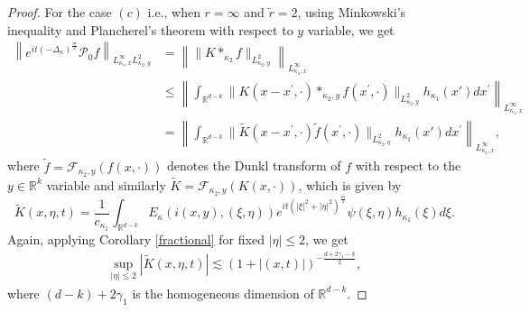 \documentclass[a4paper,11pt, reqno]{amsart}
\theoremstyle{definition}
\theoremstyle{remark}
\numberwithin{equation}{section}
\newcommand{\K}{\kappa }
\begin{document}
\begin{proof}
		For the case $(c)$ i.e., when $r=\infty$ and $\tilde{r}=2$,  using Minkowski's inequality and Plancherel's theorem with respect to $y$ variable, we get 
		\begin{align}\label{DKernel 2}\nonumber
			\left\|e^{i t(-\Delta_\kappa)^{\frac{m}{2}}}\mathcal{P}_0 f\right\|_{L_{\kappa_1, x}^{\infty} L_{\kappa_2, y}^2} 
			& =\left\|\| K*_{\kappa_2} f \|_{L_{\kappa_2, y}^2}\right\|_{L_{\kappa_1, x}^{\infty}} \\\nonumber
			& \leq\left\|\int_{\mathbb{R}^{d-k}} \| K\left(x-x^{\prime}, \cdot\right) *_{\kappa_2, y} f\left(x^{\prime}, \cdot\right) \|_{L_{\kappa_2, y}^2} h_{\kappa_1}(x') d x^{\prime}\right\|_{L_{\kappa_1, x}^{\infty}} \\
			& =\left\|\int_{\mathbb{R}^{d-k}} \| \widetilde{K}\left(x-x^{\prime}, \cdot\right) \tilde{f}\left(x^{\prime}, \cdot\right) \|_{L_{\kappa_2, \eta}^2} h_{\kappa_1}(x')  d x^{\prime}\right\|_{L_{\kappa_1, x}^{\infty}},
		\end{align}
		where  $\tilde{f}=\mathcal{F}_{{ \K_2,y}}(f(x, \cdot))$ denotes the  Dunkl transform of $f$ with respect to  the   $y \in \mathbb{R}^k$ variable and similarly $\tilde{K}=\mathcal{F}_{{\K_2,y}}(K(x, \cdot))$, which is given by 
		$$
		\widetilde{K}(x, \eta, t)=\frac{1}{{c_{\K_1}}} \int_{\mathbb{R}^{d-k}}  E_{\kappa}(i (x, y), (\xi, \eta))e^{i t (|\xi|^2+ |\eta|^2)^{\frac{m}{2}}} \psi(\xi, \eta)h_{\kappa_1}(\xi)    d \xi.
		$$
Again,  applying Corollary \ref{fractional}  for fixed $|\eta| \leq 2$, we  get
		\begin{align}\label{Deq7}
			\sup _{|\eta| \leq 2}\left|\widetilde{K}(x, \eta, t)\right| \lesssim(1+|(x, t)|)^{-\frac{d+2\gamma_1-k}{2}},
		\end{align}
        where $(d-k)+2\gamma_1$ is the homogeneous dimension of $\mathbb{R}^{d-k}.$ 
        

\end{proof}
\end{document}
